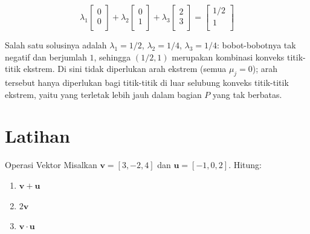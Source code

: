 $$\lambda_1 \left[
  \begin{array}{c}
  0 \\
  0 \\
  \end{array} \right]+
 \lambda_2 \left[
  \begin{array}{c}
  0 \\
  1 \\
  \end{array} \right] +
 \lambda_3 \left[
  \begin{array}{c}
  2 \\
  3 \\
  \end{array} \right]  =
 \left[
  \begin{array}{c}
  1/2 \\
  1 \\
  \end{array} \right]
$$

Salah satu solusinya adalah \(\lambda_1 = 1/2\), \(\lambda_2 = 1/4\), \(\lambda_3 = 1/4\): bobot-bobotnya tak negatif dan berjumlah \(1\), sehingga \((1/2,1)\) merupakan kombinasi konveks titik-titik ekstrem. Di sini tidak diperlukan arah ekstrem (semua \(\mu_j = 0\)); arah tersebut hanya diperlukan bagi titik-titik di luar selubung konveks titik-titik ekstrem, yaitu yang terletak lebih jauh dalam bagian \(P\) yang tak berbatas.

\section{Latihan}


\begin{ex}{Operasi Vektor}{}
\label{ex:vector-operations}
Misalkan \( \mathbf{v} = [3, -2, 4] \) dan \( \mathbf{u} = [-1, 0, 2] \). Hitung:
\begin{enumerate}
    \item \( \mathbf{v} + \mathbf{u} \)
    \item \( 2\mathbf{v} \)
    \item \( \mathbf{v} \cdot \mathbf{u} \)
\end{enumerate}
\exrefs{\S\ref{sec:math-preliminaries}}
\end{ex}


